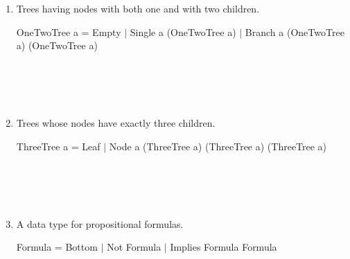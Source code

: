 \documentclass[11pt]{article}
\begin{document}
\begin{enumerate}
\item{} Trees having nodes with both one and with two children.
\begin{program**}
\> OneTwoTree a = Empty $\mid$ Single a (OneTwoTree a) $\mid$ Branch a (OneTwoTree a) (OneTwoTree a)\\
\> \\
\> \\
\> \\
\> \\
\end{program**}

\item{} Trees whose nodes have exactly three children.
\begin{program**}
\> ThreeTree a = Leaf $\mid$ Node a (ThreeTree a) (ThreeTree a) (ThreeTree a) \\
\> \\
\> \\
\> \\
\> \\
\end{program**}

\item{} A data type for propositional formulas.
\begin{program**}
\> Formula = Bottom  $\mid$ Not Formula $\mid$ Implies Formula Formula  \\
\> \\
\> \\
\> \\
\> \\
\end{program**}


\end{enumerate}
 
\end{document}

